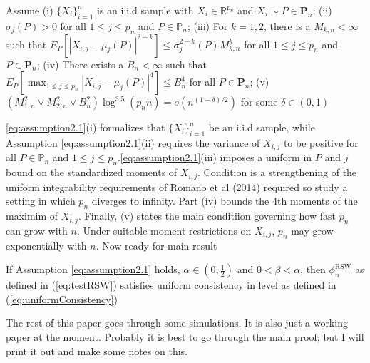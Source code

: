 \begin{assumption} 
\label{eq:assumption2.1}
Assume (i) $\{X_i\}_{i=1}^n$ is an i.i.d sample with $X_i \in \mathbb{R}^{p_n}$ and $X_i \sim P \in \mathbf{P}_n$; (ii) $\sigma_j(P) > 0$ for all $1 \leq j \leq p_n$ and $P \in \mathbb{P}_n$; (iii) For $k = 1,2$, there is a $M_{k,n} < \infty$ such that $E_P[|X_{i,j} - \mu_j(P)|^{2+k}] \leq \sigma_j^{2+k}(P)M_{k,n}^k$ for all $1\leq j \leq p_n$ and $P\in \mathbf{P}_n$; (iv) There exists a $B_n < \infty$ such that $E_P\left[\max_{1\leq j \leq p_n}\left|X_{i,j} -\mu_j(P)\right|^4\right] \leq B_n^4$ for all $P\in \mathbf{P}_n$; (v) $(M_{1,n}^2 \vee M_{2,n}^2 \vee B_n^2)\log^{3.5}(p_n n) = o(n^{(1-\delta)/2})$ for some $\delta \in (0,1)$
\end{assumption}

\ref{eq:assumption2.1}(i) formalizes that $\{X_i\}_{i=1}^n$ be an i.i.d sample, while Assumption \ref{eq:assumption2.1}(ii) requires the variance of $X_{i,j}$ to be positive for all $P \in \mathbb{P}_n$ and $1 \leq j \leq p_n$.\ref{eq:assumption2.1}(iii) imposes a uniform in $P$ and $j$ bound on the standardized moments of $X_{i,j}$. Condition is a strengthening of the uniform integrability requirements of Romano et al (2014) required so study a setting in which $p_n$ diverges to infinity. Part (iv) bounds the 4th moments of the maximim of $X_{i,j}$. Finally, (v) states the main conditiion governing how fast $p_n$ can grow with $n$. Under suitable moment restrictions on $X_{i,j}$, $p_n$ may grow exponentially with $n$. Now ready for main result

\begin{theorem}
	If Assumption \ref{eq:assumption2.1} holds, $\alpha \in (0,\frac{1}{2})$ and $0 < \beta < \alpha$, then $\phi_n^{\text{RSW}}$ as defined in (\ref{eq:testRSW}) satisfies uniform consistency in level as defined in (\ref{eq:uniformConsistency})
\end{theorem}

The rest of this paper goes through some simulations. It is also just a working paper at the moment. Probably it is best to go through the main proof; but I will print it out and make some notes on this. 

